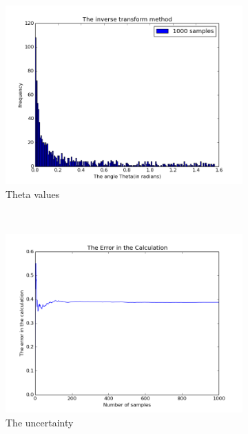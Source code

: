 \begin{figure}
    \centering
    \begin{subfigure}[b]{0.45\textwidth}
        \includegraphics[width=\textwidth]{images/inverse_method.png}
        \caption{Theta values}
        \label{fig2}
    \end{subfigure}
    ~ %
    \begin{subfigure}[b]{0.4\textwidth}
        \includegraphics[width=\textwidth]{images/uncertainity_.png}
        \caption{The uncertainty}
        \label{fig2}
    \end{subfigure}
    \label{Fig:1}
\caption{}
\end{figure}

